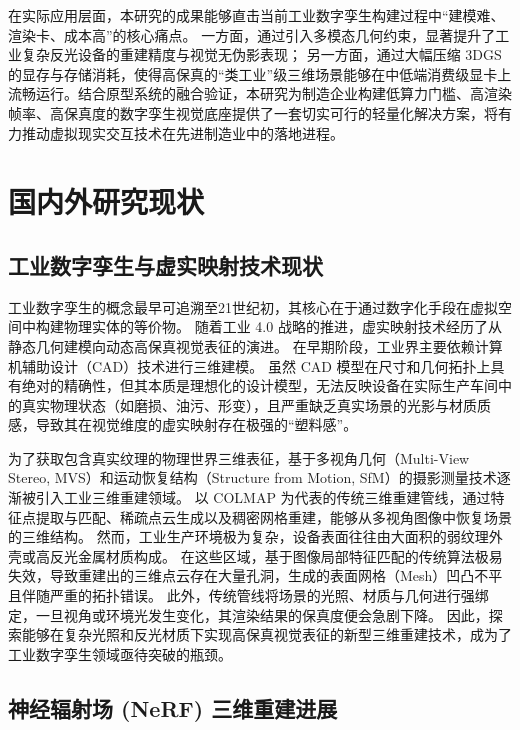 在实际应用层面，本研究的成果能够直击当前工业数字孪生构建过程中“建模难、渲染卡、成本高”的核心痛点。
一方面，通过引入多模态几何约束，显著提升了工业复杂反光设备的重建精度与视觉无伪影表现；
另一方面，通过大幅压缩 3DGS 的显存与存储消耗，使得高保真的“类工业”级三维场景能够在中低端消费级显卡上流畅运行。结合原型系统的融合验证，本研究为制造企业构建低算力门槛、高渲染帧率、高保真度的数字孪生视觉底座提供了一套切实可行的轻量化解决方案，将有力推动虚拟现实交互技术在先进制造业中的落地进程。

\section{国内外研究现状}

\subsection{工业数字孪生与虚实映射技术现状}

工业数字孪生的概念最早可追溯至21世纪初，其核心在于通过数字化手段在虚拟空间中构建物理实体的等价物。
随着工业 4.0 战略的推进，虚实映射技术经历了从静态几何建模向动态高保真视觉表征的演进。
在早期阶段，工业界主要依赖计算机辅助设计（CAD）技术进行三维建模\cite{tao2018digital}。
虽然 CAD 模型在尺寸和几何拓扑上具有绝对的精确性，但其本质是理想化的设计模型，无法反映设备在实际生产车间中的真实物理状态（如磨损、油污、形变），且严重缺乏真实场景的光影与材质质感，导致其在视觉维度的虚实映射存在极强的“塑料感”。

为了获取包含真实纹理的物理世界三维表征，基于多视角几何（Multi-View Stereo, MVS）和运动恢复结构\cite{schonberger2016structure}（Structure from Motion, SfM）的摄影测量技术逐渐被引入工业三维重建领域。
以 COLMAP\cite{schonberger2016structure} 为代表的传统三维重建管线，通过特征点提取与匹配、稀疏点云生成以及稠密网格重建，能够从多视角图像中恢复场景的三维结构。
然而，工业生产环境极为复杂，设备表面往往由大面积的弱纹理外壳或高反光金属材质构成。
在这些区域，基于图像局部特征匹配的传统算法极易失效，导致重建出的三维点云存在大量孔洞，生成的表面网格（Mesh）凹凸不平且伴随严重的拓扑错误。
此外，传统管线将场景的光照、材质与几何进行强绑定，一旦视角或环境光发生变化，其渲染结果的保真度便会急剧下降。
因此，探索能够在复杂光照和反光材质下实现高保真视觉表征的新型三维重建技术，成为了工业数字孪生领域亟待突破的瓶颈。

\subsection{神经辐射场 (NeRF) 三维重建进展}

